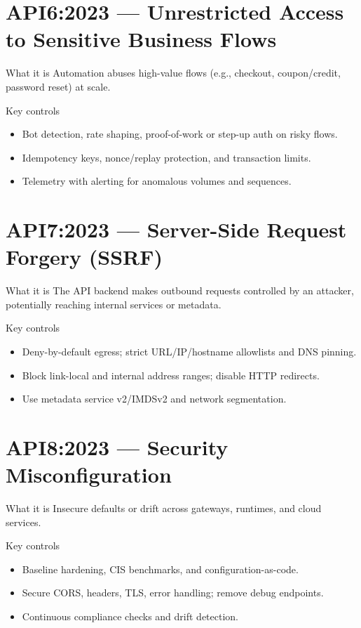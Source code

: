 \documentclass[11pt,a4paper]{article}
\begin{document}
\section{API6:2023 — Unrestricted Access to Sensitive Business Flows}
\begin{callout}{What it is}
Automation abuses high\mbox{-}value flows (e.g., checkout, coupon/credit, password reset) at scale.
\end{callout}
\begin{callout}{Key controls}
\begin{itemize}
  \item Bot detection, rate shaping, proof\mbox{-}of\mbox{-}work or step\mbox{-}up auth on risky flows.
  \item Idempotency keys, nonce/replay protection, and transaction limits.
  \item Telemetry with alerting for anomalous volumes and sequences.
\end{itemize}
\end{callout}

\section{API7:2023 — Server-Side Request Forgery (SSRF)}
\begin{callout}{What it is}
The API backend makes outbound requests controlled by an attacker, potentially reaching internal services or metadata.
\end{callout}
\begin{callout}{Key controls}
\begin{itemize}
  \item Deny\mbox{-}by\mbox{-}default egress; strict URL/IP/hostname allowlists and DNS pinning.
  \item Block link\mbox{-}local and internal address ranges; disable HTTP redirects.
  \item Use metadata service v2/IMDSv2 and network segmentation.
\end{itemize}
\end{callout}

\section{API8:2023 — Security Misconfiguration}
\begin{callout}{What it is}
Insecure defaults or drift across gateways, runtimes, and cloud services.
\end{callout}
\begin{callout}{Key controls}
\begin{itemize}
  \item Baseline hardening, CIS benchmarks, and configuration\mbox{-}as\mbox{-}code.
  \item Secure CORS, headers, TLS, error handling; remove debug endpoints.
  \item Continuous compliance checks and drift detection.
\end{itemize}
\end{callout}
\end{document}
